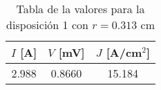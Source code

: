 \begin{table}[h!]
    \centering
\begin{tabular}{ccc}
\toprule
$I$ [A] & $V$ [mV] & $J$ [A/cm$^2$] \\
\midrule
2.988 & 0.8660 & 15.184 \\
\bottomrule
\end{tabular}
    \caption{Tabla de la valores para la disposición 1 con $r=0.313$ cm}
    \label{Tab:VIJ_mini_1}
\end{table}
